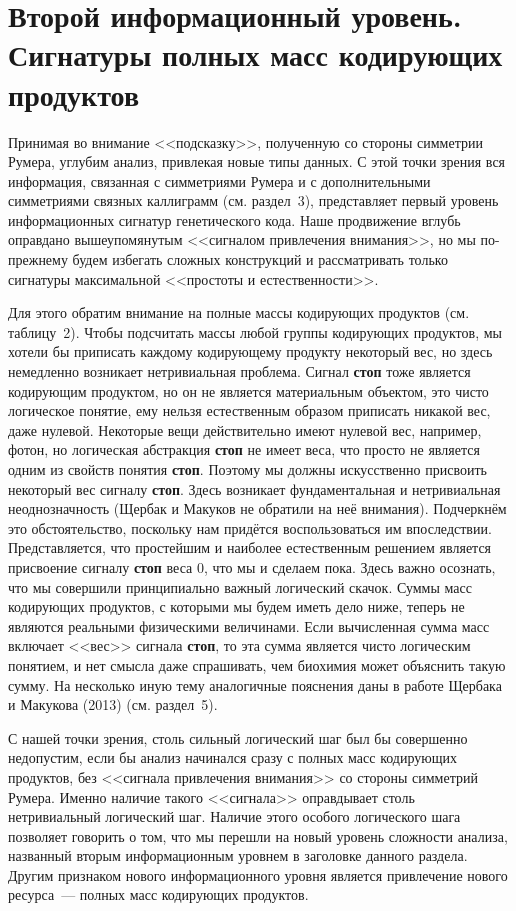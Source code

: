 \documentclass[12pt]{article}
\begin{document}
\section{Второй информационный уровень. Сигнатуры полных масс кодирующих продуктов}

Принимая во внимание <<подсказку>>, полученную со стороны симметрии Румера, углубим анализ, привлекая новые типы данных. С этой точки зрения вся информация, связанная с симметриями Румера и с дополнительными симметриями связных каллиграмм (см. раздел~3), представляет первый уровень информационных сигнатур генетического кода. Наше продвижение вглубь оправдано вышеупомянутым <<сигналом привлечения внимания>>, но мы по-прежнему будем избегать сложных конструкций и рассматривать только сигнатуры максимальной <<простоты и естественности>>.

Для этого обратим внимание на полные массы кодирующих продуктов (см. таблицу~2). Чтобы подсчитать массы любой группы кодирующих продуктов, мы хотели бы приписать каждому кодирующему продукту некоторый вес, но здесь немедленно возникает нетривиальная проблема. Сигнал \textbf{стоп} тоже является кодирующим продуктом, но он не является материальным объектом, это чисто логическое понятие, ему нельзя естественным образом приписать никакой вес, даже нулевой. Некоторые вещи действительно имеют нулевой вес, например, фотон, но логическая абстракция \textbf{стоп} не имеет веса, что просто не является одним из свойств понятия \textbf{стоп}. Поэтому мы должны искусственно присвоить некоторый вес сигналу \textbf{стоп}. Здесь возникает фундаментальная и нетривиальная неоднозначность (Щербак и Макуков не обратили на неё внимания). Подчеркнём это обстоятельство, поскольку нам придётся воспользоваться им впоследствии. Представляется, что простейшим и наиболее естественным решением является присвоение сигналу \textbf{стоп} веса 0, что мы и сделаем пока. Здесь важно осознать, что мы совершили принципиально важный логический скачок. Суммы масс кодирующих продуктов, с которыми мы будем иметь дело ниже, теперь не являются реальными физическими величинами. Если вычисленная сумма масс включает <<вес>> сигнала \textbf{стоп}, то эта сумма является чисто логическим понятием, и нет смысла даже спрашивать, чем биохимия может объяснить такую сумму. На несколько иную тему аналогичные пояснения даны в работе Щербака и Макукова (2013) (см. раздел~5).

С нашей точки зрения, столь сильный логический шаг был бы совершенно недопустим, если бы анализ начинался сразу с полных масс кодирующих продуктов, без <<сигнала привлечения внимания>> со стороны симметрий Румера. Именно наличие такого <<сигнала>> оправдывает столь нетривиальный логический шаг. Наличие этого особого логического шага позволяет говорить о том, что мы перешли на новый уровень сложности анализа, названный вторым информационным уровнем в заголовке данного раздела. Другим признаком нового информационного уровня является привлечение нового ресурса~--- полных масс кодирующих продуктов.
\end{document}

